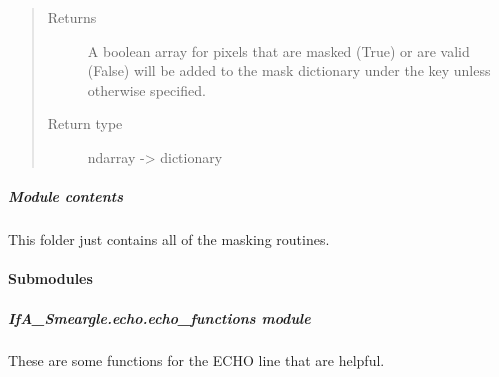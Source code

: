 \documentclass[letterpaper,10pt,english]{sphinxmanual}
\begin{document}
\begin{fulllineitems}
\begin{quote}
\begin{description}
\begin{itemize}
\end{itemize}

\item[{Returns}] \leavevmode
{} \textendash{} A boolean array for pixels that are masked (True) or are valid
(False) will be added to the mask dictionary under the
key  unless otherwise specified.

\item[{Return type}] \leavevmode
ndarray -\textgreater{} dictionary

\end{description}\end{quote}

\end{fulllineitems}



\subparagraph{Module contents}
\label{\detokenize{python_docstrings/IfA_Smeargle.echo.masks:module-IfA_Smeargle.echo.masks}}\label{\detokenize{python_docstrings/IfA_Smeargle.echo.masks:module-contents}}
This folder just contains all of the masking routines.


\paragraph{Submodules}
\label{\detokenize{python_docstrings/IfA_Smeargle.echo:submodules}}

\subparagraph{IfA\_Smeargle.echo.echo\_functions module}
\label{\detokenize{python_docstrings/IfA_Smeargle.echo.echo_functions:module-IfA_Smeargle.echo.echo_functions}}\label{\detokenize{python_docstrings/IfA_Smeargle.echo.echo_functions:ifa-smeargle-echo-echo-functions-module}}\label{\detokenize{python_docstrings/IfA_Smeargle.echo.echo_functions::doc}}
These are some functions for the ECHO line that are helpful.
\end{document}
